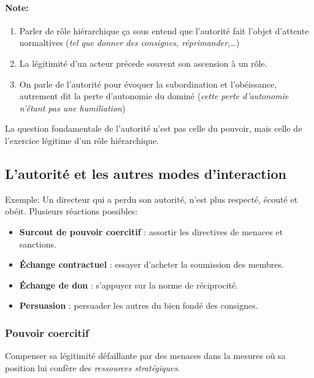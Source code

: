 \documentclass[11pt]{article} %
\begin{document}
\paragraph{Note: } 
\begin{enumerate}
    \item Parler de rôle hiérarchique ça sous entend que l'autorité
    fait l'objet d'attente normaltives (\textit{tel que donner des
    consignes, réprimander,\ldots})

    \item La légitimité d'un acteur précede souvent son ascension à
    un rôle.

    \item On parle de l'autorité pour évoquer la subordination et
    l'obéissance, autrement dit la perte d'autonomie du dominé
    (\textit{cette perte d'autonomie n'étant pas une humiliation})
\end{enumerate}

La question fondamentale de l'autorité n'est pas celle du pouvoir, mais
celle de l'exercice légitime d'un rôle hiérarchique.

\subsection{L'autorité et les autres modes d'interaction}

Exemple: Un directeur qui a perdu son autorité, n'est plus respecté,
écouté et obéit.
Plusieurs réactions possibles:

\begin{itemize}

 \item \textbf{Surcout de pouvoir coercitif} : assortir les directives
de menaces et sanctions.
	\item \textbf{Échange contractuel} : essayer d'acheter la soumission
        des membres.
	\item \textbf{Échange de don} : s'appuyer sur la norme de
        réciprocité.
	\item \textbf{Persuasion} : persuader les autres du bien fondé des
        consignes. 
\end{itemize}

\subsubsection{Pouvoir coercitif} 

Compenser sa légitimité défaillante par des menaces dans la mesures où
sa position lui confère des \textit{ressources stratégiques}.
\end{document}
